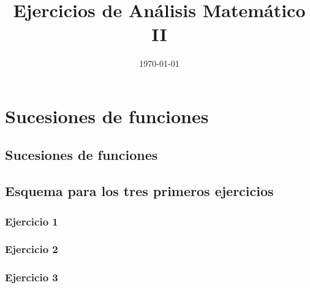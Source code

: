 \documentclass[11pt,spanish]{article} %
\title{Ejercicios de Análisis Matemático II}
\author{ }
\date{\today}
\begin{document}
\maketitle
\tableofcontents %
\newpage
\setlength\parindent{0pt} %

\section{Sucesiones de funciones}
\subsection{Sucesiones de funciones}
	\subsection{Esquema para los tres primeros ejercicios}
	
	\subsubsection{Ejercicio 1}
	
	\subsubsection{Ejercicio 2}
	
	\subsubsection{Ejercicio 3}
	
\end{document}
